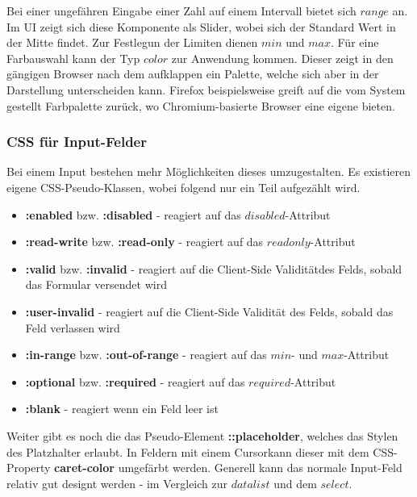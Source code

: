 Bei einer ungefähren Eingabe einer Zahl auf einem Intervall bietet sich $range$ an.
Im UI zeigt sich diese Komponente als Slider, wobei sich der Standard Wert in der Mitte findet.
Zur Festlegun der Limiten dienen $min$ und $max$.
Für eine Farbauswahl kann der Typ $color$ zur Anwendung kommen. 
Dieser zeigt in den gängigen Browser nach dem aufklappen ein Palette, welche sich aber in der Darstellung unterscheiden kann. 
Firefox beispielsweise greift auf die vom System gestellt Farbpalette zurück, wo Chromium-basierte Browser eine eigene bieten.

\subsubsection{{\color{dgray} CSS für Input-Felder}}
Bei einem Input bestehen mehr Möglichkeiten dieses umzugestalten.
Es existieren eigene CSS-Pseudo-Klassen, wobei folgend nur ein Teil aufgezählt wird.

\begin{itemize}
    \item \textbf{:enabled} bzw. \textbf{:disabled} - reagiert auf das $disabled$-Attribut
    \item \textbf{:read-write} bzw. \textbf{:read-only} - reagiert auf das $readonly$-Attribut
    \item \textbf{:valid} bzw. \textbf{:invalid} - reagiert auf die Client-Side Validität\footnotemark des Felds, sobald das Formular versendet wird
    \item \textbf{:user-invalid} - reagiert auf die Client-Side Validität des Felds, sobald das Feld verlassen wird
    \item \textbf{:in-range} bzw. \textbf{:out-of-range} - reagiert auf das $min$- und $max$-Attribut
    \item \textbf{:optional} bzw. \textbf{:required} - reagiert auf das $required$-Attribut
    \item \textbf{:blank} - reagiert wenn ein Feld leer ist
\end{itemize}

Weiter gibt es noch die das Pseudo-Element \textbf{::placeholder}, welches das Stylen des Platzhalter erlaubt.
In Feldern mit einem Cursor\footnotemark kann dieser mit dem CSS-Property \textbf{caret-color} umgefärbt werden.
Generell kann das normale Input-Feld relativ gut designt werden - im Vergleich zur $datalist$ und dem $select$.

